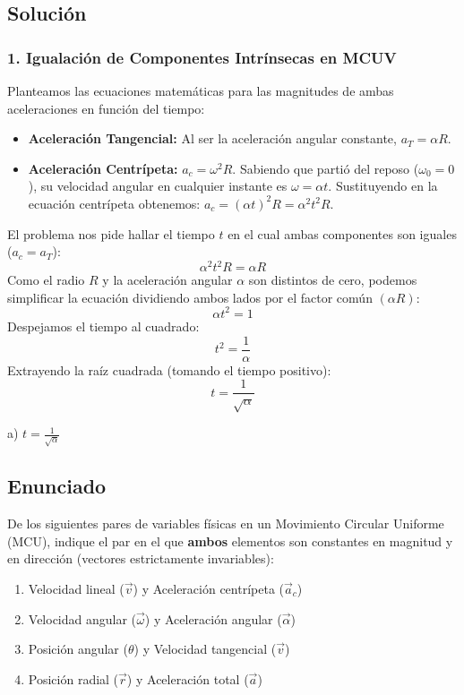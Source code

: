 \documentclass[12pt, a4paper]{article}
\begin{document}
\subsection*{Solución}

\subsubsection*{1. Igualación de Componentes Intrínsecas en MCUV}
Planteamos las ecuaciones matemáticas para las magnitudes de ambas aceleraciones en función del tiempo:
\begin{itemize}
    \item \textbf{Aceleración Tangencial:} Al ser la aceleración angular constante, $a_T = \alpha R$.
    \item \textbf{Aceleración Centrípeta:} $a_c = \omega^2 R$. Sabiendo que partió del reposo ($\omega_0 = 0$), su velocidad angular en cualquier instante es $\omega = \alpha t$. Sustituyendo en la ecuación centrípeta obtenemos: $a_c = (\alpha t)^2 R = \alpha^2 t^2 R$.
\end{itemize}

El problema nos pide hallar el tiempo $t$ en el cual ambas componentes son iguales ($a_c = a_T$):
$$ \alpha^2 t^2 R = \alpha R $$
Como el radio $R$ y la aceleración angular $\alpha$ son distintos de cero, podemos simplificar la ecuación dividiendo ambos lados por el factor común $(\alpha R)$:
$$ \alpha t^2 = 1 $$
Despejamos el tiempo al cuadrado:
$$ t^2 = \frac{1}{\alpha} $$
Extrayendo la raíz cuadrada (tomando el tiempo positivo):
$$ t = \frac{1}{\sqrt{\alpha}} $$

\begin{tcolorbox}[colback=green!5!white, colframe=green!50!black, title=Respuesta Final]
\centering \Large a) $t = \frac{1}{\sqrt{\alpha}}$
\end{tcolorbox}

\newpage

\subsection*{Enunciado}
De los siguientes pares de variables físicas en un Movimiento Circular Uniforme (MCU), indique el par en el que \textbf{ambos} elementos son constantes en magnitud y en dirección (vectores estrictamente invariables):
\begin{enumerate}[label=\alph*)]
    \item Velocidad lineal ($\vec{v}$) y Aceleración centrípeta ($\vec{a}_c$)
    \item Velocidad angular ($\vec{\omega}$) y Aceleración angular ($\vec{\alpha}$)
    \item Posición angular ($\theta$) y Velocidad tangencial ($\vec{v}$)
    \item Posición radial ($\vec{r}$) y Aceleración total ($\vec{a}$)
\end{enumerate}
\end{document}
